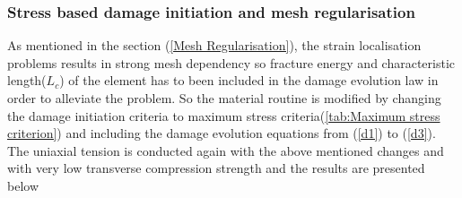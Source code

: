 \documentclass[a4paper,12pt]{extarticle}
\begin{document}
\subsubsection*{Stress based damage initiation and mesh regularisation}
\indent\indent\indent  As mentioned in the section (\ref{Mesh Regularisation}), the strain localisation problems results in strong mesh dependency so fracture energy and characteristic length($L_{c}$) of the element has to been included in the damage evolution law in order to alleviate the problem. So the material routine is modified by changing the damage initiation criteria to maximum stress criteria(\ref{tab:Maximum stress criterion}) and including the damage evolution equations from (\ref{d1}) to (\ref{d3}). The uniaxial tension is conducted again with the above mentioned changes and with very low transverse compression strength and the results are presented below
\end{document}
